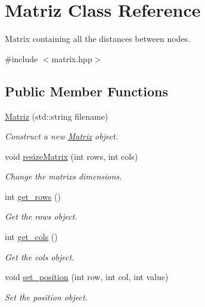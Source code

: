 \hypertarget{classMatriz}{}\section{Matriz Class Reference}
\label{classMatriz}


Matrix containing all the distances between nodes.  




{\ttfamily \#include $<$matrix.\+hpp$>$}

\subsection*{Public Member Functions}
\begin{DoxyCompactItemize}
\item 
\hyperlink{classMatriz_a388709cfee356a0c78b66e3f538e9318}{Matriz} (std\+::string filename)
\begin{DoxyCompactList}\small\item\em Construct a new \hyperlink{classMatriz}{Matriz} object. \end{DoxyCompactList}\item 
void \hyperlink{classMatriz_aa929f933e9088dc0efecaa9a46d555d9}{resize\+Matrix} (int rows, int cols)
\begin{DoxyCompactList}\small\item\em Change the matrix\textquotesingle{}s dimensions. \end{DoxyCompactList}\item 
int \hyperlink{classMatriz_a6b18342f8c083baece693ff41185a206}{get\+\_\+rows} ()
\begin{DoxyCompactList}\small\item\em Get the rows object. \end{DoxyCompactList}\item 
int \hyperlink{classMatriz_ad6915f9b31f93230a3ce05d01d23a47b}{get\+\_\+cols} ()
\begin{DoxyCompactList}\small\item\em Get the cols object. \end{DoxyCompactList}\item 
void \hyperlink{classMatriz_a71fea2383ce785254c2f27da25ef70c8}{set\+\_\+position} (int row, int col, int value)
\begin{DoxyCompactList}\small\item\em Set the position object. \end{DoxyCompactList}\item 

\end{DoxyCompactItemize}
